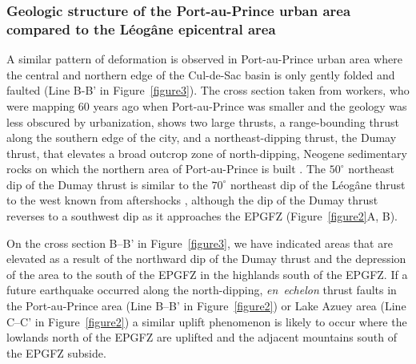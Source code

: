 \documentclass[linenumbers,draft]{agujournal}
\begin{document}
\subsubsection{Geologic structure of the Port-au-Prince urban area compared to the L\'eog\^ane epicentral area} 
A similar pattern of deformation is observed in Port-au-Prince urban area where the central and northern edge of the Cul-de-Sac basin is only gently folded and faulted \citep{bachhuber2010,rathje2011damage,cox2011shear,mchugh2011offshore,saint2015seismotectonics} (Line B-B' in Figure~\ref{figure3}). The cross section taken from workers, who were mapping 60 years ago when Port-au-Prince was smaller and the geology was less obscured by urbanization, shows two large thrusts, a range-bounding thrust along the southern edge of the city, and a northeast-dipping thrust, the Dumay thrust, that elevates a broad outcrop zone of north-dipping, Neogene sedimentary rocks on which the northern area of Port-au-Prince is built \citep{rathje2014geotechnical}. The $50^{\circ}$ northeast dip of the Dumay thrust is similar to the $70^{\circ}$ northeast dip of the L\'eog\^ane thrust to the west known from aftershocks \citep{douilly2013crustal,douilly2015three}, although the dip of the Dumay thrust reverses to a southwest dip as it approaches the EPGFZ (Figure~\ref{figure2}A, B). 

On the cross section B--B' in Figure~\ref{figure3}, we have indicated areas that are elevated as a result of the northward dip of the Dumay thrust and the depression of the area to the south of the EPGFZ in the highlands south of the EPGFZ. If a future earthquake occurred along the north-dipping, \textit{en~echelon} thrust faults in the Port-au-Prince area (Line B--B' in Figure~\ref{figure2}) or Lake Azuey area (Line C--C' in Figure~\ref{figure2}) a similar uplift phenomenon is likely to occur where the lowlands north of the EPGFZ are uplifted and the adjacent mountains south of the EPGFZ subside.
\end{document}
